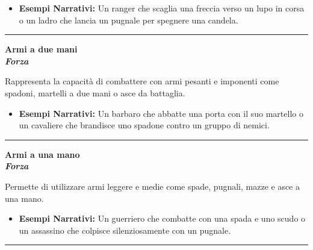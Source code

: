 \documentclass[../manuale_main.tex]{subfiles}
\begin{document}
\begin{itemize}
\item \textbf{Esempi Narrativi:} Un ranger che scaglia una freccia verso un lupo in corsa o un ladro che lancia un pugnale per spegnere una candela.
\end{itemize}

\vspace{0.5cm}
\noindent
\begin{center}
\rule{\textwidth}{0.4pt} 
\end{center}
\vspace{0.5cm}

\begin{center}
\textbf{\large{Armi a due mani}}\\ \textit{\textbf{Forza}}\\
\end{center}
Rappresenta la capacità di combattere con armi pesanti e imponenti come spadoni, martelli a due mani o asce da battaglia.

\begin{itemize}
\item \textbf{Esempi Narrativi:} Un barbaro che abbatte una porta con il suo martello o un cavaliere che brandisce uno spadone contro un gruppo di nemici.
\end{itemize}

\vspace{0.5cm}
\noindent
\begin{center}
\rule{\textwidth}{0.4pt} 
\end{center}
\vspace{0.5cm}

\begin{center}
\textbf{\large{Armi a una mano}}\\ \textit{\textbf{Forza}}\\
\end{center}
Permette di utilizzare armi leggere e medie come spade, pugnali, mazze e asce a una mano.

\begin{itemize}
\item \textbf{Esempi Narrativi:} Un guerriero che combatte con una spada e uno scudo o un assassino che colpisce silenziosamente con un pugnale.
\end{itemize}

\vspace{0.5cm}
\noindent
\begin{center}
\rule{\textwidth}{0.4pt} 
\end{center}
\vspace{0.5cm}
\end{document}
